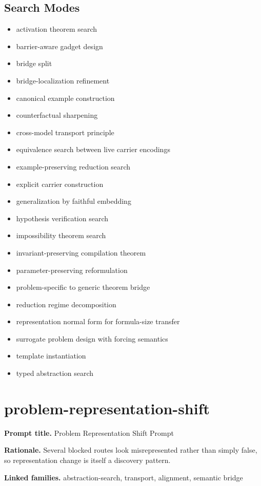 \documentclass[11pt]{article}
\begin{document}
\subsection*{Search Modes}
\begin{itemize}[leftmargin=*,itemsep=0.2em]
\item activation theorem search
\item barrier-aware gadget design
\item bridge split
\item bridge-localization refinement
\item canonical example construction
\item counterfactual sharpening
\item cross-model transport principle
\item equivalence search between live carrier encodings
\item example-preserving reduction search
\item explicit carrier construction
\item generalization by faithful embedding
\item hypothesis verification search
\item impossibility theorem search
\item invariant-preserving compilation theorem
\item parameter-preserving reformulation
\item problem-specific to generic theorem bridge
\item reduction regime decomposition
\item representation normal form for formula-size transfer
\item surrogate problem design with forcing semantics
\item template instantiation
\item typed abstraction search
\end{itemize}
\section{problem-representation-shift}
\textbf{Prompt title.} Problem Representation Shift Prompt

\textbf{Rationale.} Several blocked routes look misrepresented rather than simply false, so representation change is itself a discovery pattern.

\textbf{Linked families.} abstraction-search, transport, alignment, semantic bridge
\end{document}
